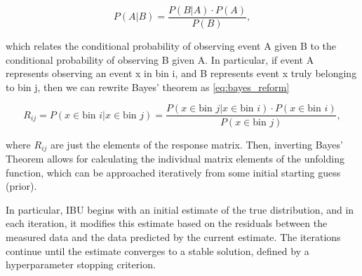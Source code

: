         \begin{equation}
            P(A|B) = \frac{P(B|A) \cdot P(A)}{P(B)},
        \end{equation}\label{eq:bayes}

        which relates the conditional probability of observing event A given B to the conditional probability of observing B given A. In particular, if event A represents observing an event x in bin i, and B represents event x truly belonging to bin j, then we can rewrite Bayes' theorem as \eqref{eq:bayes_reform}


        \begin{equation}
            R_{ij} = P(x \in \text{bin } i| x \in \text{bin } j) = \frac{P(x \in \text{bin } j|x \in \text{bin } i) \cdot P(x \in \text{bin } i)}{P(x \in \text{bin } j)},
        \end{equation}\label{eq:bayes_reform}


        where $R_{ij}$ are just the elements of the response matrix. Then, inverting Bayes' Theorem allows for calculating the individual matrix elements of the unfolding function, which can be approached iteratively from some initial starting guess (prior). 

        In particular, IBU begins with an initial estimate of the true distribution, and in each iteration, it modifies this estimate based on the residuals between the measured data and the data predicted by the current estimate. The iterations continue until the estimate converges to a stable solution, defined by a hyperparameter stopping criterion. 


        

